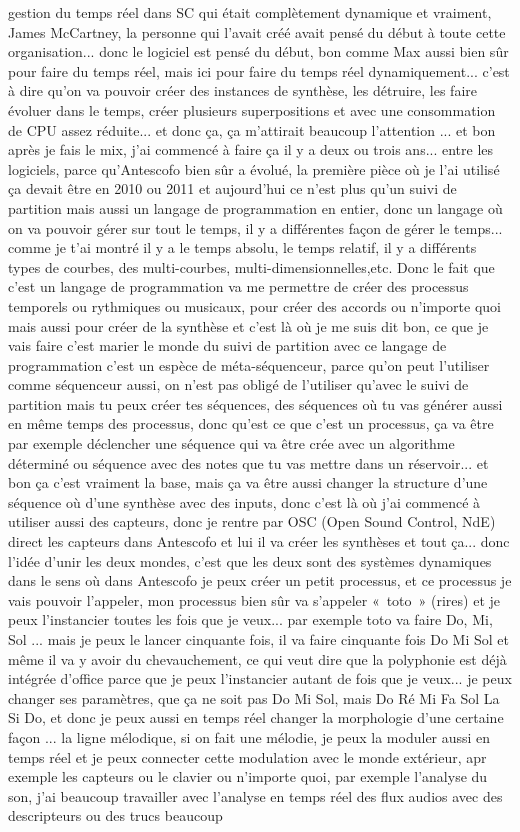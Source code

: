 gestion du temps réel dans SC qui était complètement dynamique et vraiment, James McCartney, la personne qui l'avait créé avait pensé du début à toute cette organisation... donc le logiciel est pensé du début, bon comme Max aussi bien sûr pour faire du temps réel, mais ici pour faire du temps réel dynamiquement... c'est à dire qu'on va pouvoir créer des instances de synthèse, les détruire, les faire évoluer dans le temps, créer plusieurs superpositions et avec une consommation de CPU assez réduite... et donc ça, ça m'attirait beaucoup l'attention ... et bon après je fais le mix, j'ai commencé à faire ça il y a deux ou trois ans... entre les logiciels, parce qu'Antescofo bien sûr a évolué, la première pièce où je l'ai utilisé ça devait être en 2010 ou 2011 et aujourd'hui ce n'est plus qu'un suivi de partition mais aussi un langage de programmation en entier, donc un langage où on va pouvoir gérer sur tout le temps, il y a différentes façon de gérer le temps... comme je t'ai montré il y a le temps absolu, le temps relatif, il y a différents types de courbes, des multi-courbes, multi-dimensionnelles,etc. Donc le fait que c'est un langage de programmation va me permettre de créer des processus temporels ou rythmiques ou musicaux, pour créer des accords ou n'importe quoi mais aussi pour créer de la synthèse et c'est là où je me suis dit bon, ce que je vais faire c'est marier le monde du suivi de partition avec ce langage de programmation c'est un espèce de méta-séquenceur, parce qu'on peut l'utiliser comme séquenceur aussi, on n'est pas obligé de l'utiliser qu'avec le suivi de partition mais tu peux créer tes séquences, des séquences où tu vas générer aussi en même temps des processus, donc qu'est ce que c'est un processus, ça va être par exemple déclencher une séquence qui va être crée avec un algorithme déterminé ou séquence avec des notes que tu vas mettre dans un réservoir... et bon ça c'est vraiment la base, mais ça va être aussi changer la structure d'une séquence où d'une synthèse avec des inputs, donc c'est là où j'ai commencé à utiliser aussi des capteurs, donc je rentre par OSC (Open Sound Control, NdE) direct les capteurs dans Antescofo et lui il va créer les synthèses et tout ça... donc l'idée d'unir les deux mondes, c'est que les deux sont des systèmes dynamiques dans le sens où dans Antescofo je peux créer un petit processus, et ce processus je vais pouvoir l'appeler, mon processus bien sûr va s'appeler « toto » (rires) et je peux l'instancier toutes les fois que je veux... par exemple toto va faire Do, Mi, Sol ... mais je peux le lancer cinquante fois, il va faire cinquante fois Do Mi Sol et même il va y avoir du chevauchement, ce qui veut dire que la polyphonie est déjà intégrée d'office parce que je peux l'instancier autant de fois que je veux... je peux changer ses paramètres, que ça ne soit pas Do Mi Sol, mais Do Ré Mi Fa Sol La Si Do, et donc je peux aussi en temps réel changer la morphologie d'une certaine façon ... la ligne mélodique, si on fait une mélodie, je peux la moduler aussi en temps réel et je peux connecter cette modulation avec le monde extérieur, apr exemple les capteurs ou le clavier ou n'importe quoi, par exemple l'analyse du son, j'ai beaucoup travailler avec l'analyse en temps réel des flux audios avec des descripteurs ou des trucs beaucoup 